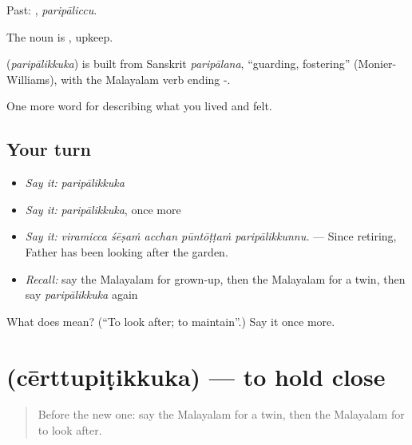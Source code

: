 Past: , \emph{paripāliccu}.

The noun is , upkeep.

\begin{cousinweb}
\textbf{} (\emph{paripālikkuka}) is built from Sanskrit \emph{paripālana}, \textquotedblleft{}guarding, fostering\textquotedblright{} (Monier-Williams), with the Malayalam verb ending -.
\end{cousinweb}

\begin{grammarlens}[title={What you've built}]
One more word for describing what you lived and felt.
\end{grammarlens}

\subsection*{Your turn}
\begin{itemize}
\raggedright
  \item \emph{Say it:} \emph{paripālikkuka}
  \item \emph{Say it:} \emph{paripālikkuka}, once more
  \item \emph{Say it:} \emph{viramicca śēṣaṁ acchan pūntōṭṭaṁ paripālikkunnu.} — Since retiring, Father has been looking after the garden.
  \item \emph{Recall:} say the Malayalam for grown-up, then the Malayalam for a twin, then say \emph{paripālikkuka} again
\end{itemize}

\begin{tcolorbox}[breakable,colback=teal!4,colframe=teal!35!black,title={Before you move on}]
What does  mean? (\textquotedblleft{}To look after; to maintain\textquotedblright{}.) Say it once more.
\end{tcolorbox}
\section[\texorpdfstring{\ml{ചേർത്തുപിടിക്കുക} (cērttupiṭikkuka)}{ചേർത്തുപിടിക്കുക (cērttupiṭikkuka)}]{ (cērttupiṭikkuka) — to hold close}

\label{lesson:ML-C559-certtupitikkuka}



\begin{quote}
Before the new one: say the Malayalam for a twin, then the Malayalam for to look after.
\end{quote}

